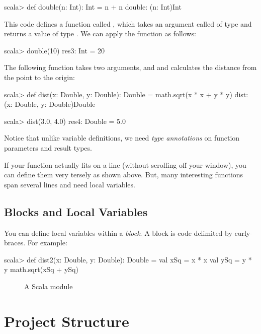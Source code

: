 \documentclass{book}
\begin{document}
\begin{console}
scala> def double(n: Int): Int = n + n
double: (n: Int)Int
\end{console}

This code defines a function called , which takes an argument called
 of type  and returns a value of type . We can apply the
function as follows:

\begin{console}
scala> double(10)
res3: Int = 20
\end{console}

The following function takes two arguments,  and  and calculates the
distance from the point  to the origin:

\begin{console}
scala> def dist(x: Double, y: Double): Double = math.sqrt(x * x + y * y)
dist: (x: Double, y: Double)Double

scala> dist(3.0, 4.0)
res4: Double = 5.0
\end{console}

Notice that unlike variable definitions, we need \emph{type annotations}
on function parameters and result types.

If your function actually fits on a line (without scrolling off your window),
you can define them very tersely as shown above. But, many interesting
functions span several lines and need local variables.

\subsection{Blocks and Local Variables}

You can define local variables within a \emph{block}. A block is code delimited by
curly-braces. For example:

\begin{console}
scala> def dist2(x: Double, y: Double): Double = {
  val xSq = x * x
  val ySq = y * y
  math.sqrt(xSq + ySq)
}
\end{console}

\begin{figure}

\caption{A Scala module}
\label{lecture1code}
\end{figure}

\section{\sbt{} Project Structure}
\end{document}
